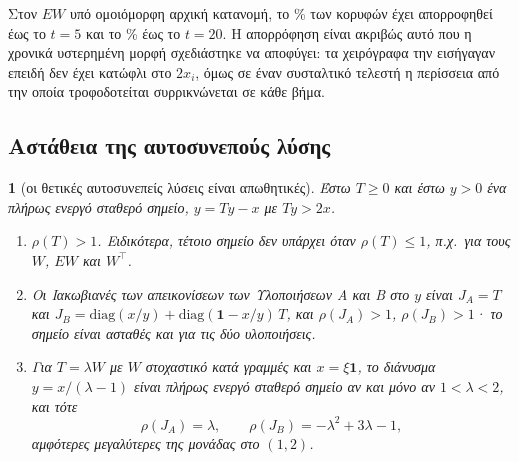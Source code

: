 \documentclass[11pt,a4paper]{article}
\theoremstyle{definition}
\theoremstyle{plain}
\newcommand{\genpropname}{}
\newtheorem*{genprop}{\genpropname}
\newenvironment{prop}[1]{\renewcommand{\genpropname}{Πρόταση #1}\begin{genprop}}{\end{genprop}}
\newcommand{\diag}{\mathrm{diag}}
\newcommand{\one}{\mathbf{1}}
\begin{document}
Στον $EW$ υπό ομοιόμορφη αρχική κατανομή, το \TrivBFiveUnif\% των κορυφών έχει απορροφηθεί έως το $t=5$ και το \TrivBTwentyUnif\% έως το $t=20$. Η απορρόφηση είναι ακριβώς αυτό που η χρονικά υστερημένη μορφή σχεδιάστηκε να αποφύγει: τα χειρόγραφα την εισήγαγαν επειδή δεν έχει κατώφλι στο $2x_i$, όμως σε έναν συσταλτικό τελεστή η περίσσεια από την οποία τροφοδοτείται συρρικνώνεται σε κάθε βήμα.

\subsection{Αστάθεια της αυτοσυνεπούς λύσης}

\begin{prop}{C}[οι θετικές αυτοσυνεπείς λύσεις είναι απωθητικές]
Έστω $T\ge0$ και έστω $y>0$ ένα πλήρως ενεργό σταθερό σημείο, $y=Ty-x$ με $Ty>2x$.
\begin{enumerate}[label=(\roman*),leftmargin=2em]
\item $\rho(T)>1$. Ειδικότερα, τέτοιο σημείο δεν υπάρχει όταν $\rho(T)\le1$, π.χ.\ για τους $W$, $EW$ και $W^{\top}$.
\item Οι Ιακωβιανές των απεικονίσεων των Υλοποιήσεων Α και Β στο $y$ είναι $J_A=T$ και $J_B=\diag(x/y)+\diag(\one-x/y)\,T$, και $\rho(J_A)>1$, $\rho(J_B)>1$· το σημείο είναι ασταθές και για τις δύο υλοποιήσεις.
\item Για $T=\lambda W$ με $W$ στοχαστικό κατά γραμμές και $x=\xi\one$, το διάνυσμα $y=x/(\lambda-1)$ είναι πλήρως ενεργό σταθερό σημείο αν και μόνο αν $1<\lambda<2$, και τότε
\begin{equation}\label{eq:rhoJB}
\rho(J_A)=\lambda,\qquad \rho(J_B)=-\lambda^2+3\lambda-1,
\end{equation}
αμφότερες μεγαλύτερες της μονάδας στο $(1,2)$.
\end{enumerate}
\end{prop}
\end{document}
